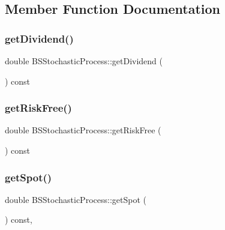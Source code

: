 \subsection{Member Function Documentation}
\hypertarget{class_b_s_stochastic_process_a42caffac3e61f92af6849b86df0d9b6b}{}\label{class_b_s_stochastic_process_a42caffac3e61f92af6849b86df0d9b6b} 
\subsubsection{\texorpdfstring{get\+Dividend()}{getDividend()}}
{\footnotesize\ttfamily double B\+S\+Stochastic\+Process\+::get\+Dividend (\begin{DoxyParamCaption}{ }\end{DoxyParamCaption}) const}

\hypertarget{class_b_s_stochastic_process_a9cd46cb3dceb0aee302bf3a6c2ea39a1}{}\label{class_b_s_stochastic_process_a9cd46cb3dceb0aee302bf3a6c2ea39a1} 
\subsubsection{\texorpdfstring{get\+Risk\+Free()}{getRiskFree()}}
{\footnotesize\ttfamily double B\+S\+Stochastic\+Process\+::get\+Risk\+Free (\begin{DoxyParamCaption}{ }\end{DoxyParamCaption}) const}

\hypertarget{class_b_s_stochastic_process_a604f867d372fc55a6dfae456f56604ea}{}\label{class_b_s_stochastic_process_a604f867d372fc55a6dfae456f56604ea} 
\subsubsection{\texorpdfstring{get\+Spot()}{getSpot()}}
{\footnotesize\ttfamily double B\+S\+Stochastic\+Process\+::get\+Spot (\begin{DoxyParamCaption}{ }\end{DoxyParamCaption}) const\hspace{0.3cm}{\ttfamily [override]}, {\ttfamily [virtual]}}



